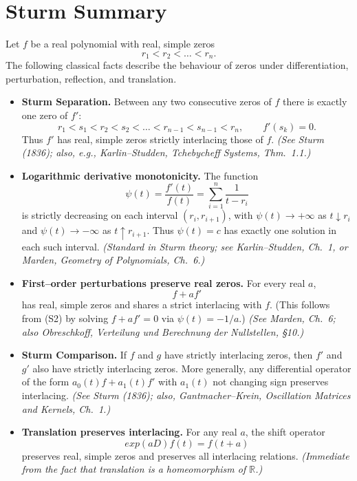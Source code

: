 \documentclass[11pt]{article}
\theoremstyle{breakdef}
\begin{document}
\section{Sturm Summary}

Let $f$ be a real polynomial with real, simple zeros
\[
r_1 < r_2 < \dots < r_n.
\]
The following classical facts describe the behaviour of zeros under
differentiation, perturbation, reflection, and translation.

\begin{itemize}

\item[\textbf{(S1)}] 
\textbf{Sturm Separation.}
Between any two consecutive zeros of $f$ there is exactly one zero of $f'$:
\[
r_1 < s_1 < r_2 < s_2 < \dots < r_{n-1} < s_{n-1} < r_n,
\qquad f'(s_k)=0.
\]
Thus $f'$ has real, simple zeros strictly interlacing those of $f$.
\textit{(See Sturm (1836); also, e.g., Karlin--Studden,
\emph{Tchebycheff Systems}, Thm.~1.1.)}

\item[\textbf{(S2)}]
\textbf{Logarithmic derivative monotonicity.}\newline
The function
\[
\psi(t)=\frac{f'(t)}{f(t)}=\sum_{i=1}^n \frac{1}{t-r_i}
\]
is strictly decreasing on each interval $(r_i,r_{i+1})$, with 
$\psi(t)\to +\infty$ as $t\downarrow r_i$ and 
$\psi(t)\to -\infty$ as $t\uparrow r_{i+1}$.
Thus $\psi(t)=c$ has exactly one solution in each such interval.
\textit{(Standard in Sturm theory; see Karlin--Studden, Ch.~1, or
Marden, \emph{Geometry of Polynomials}, Ch.~6.)}

\item[\textbf{(S3)}]
\textbf{First–order perturbations preserve real zeros.} \newline
For every real $a$,
\[
f + a f'
\]
has real, simple zeros and shares a strict interlacing with $f$.  
(This follows from (S2) by solving $f+af'=0$ via $\psi(t)=-1/a$.)
\textit{(See Marden, Ch.~6; also Obreschkoff,
\emph{Verteilung und Berechnung der Nullstellen}, §10.)}

\item[\textbf{(S4)}]
\textbf{Sturm Comparison.}
If $f$ and $g$ have strictly interlacing zeros, then $f'$ and $g'$
also have strictly interlacing zeros.
More generally, any differential operator of the form
$a_0(t)f + a_1(t)f'$ with $a_1(t)$ not changing sign
preserves interlacing.
\textit{(See Sturm (1836); also, Gantmacher–Krein,
\emph{Oscillation Matrices and Kernels}, Ch.~1.)}


\item[\textbf{(S5)}]
\textbf{Translation preserves interlacing.}
For any real $a$, the shift operator
\[
exp(aD)f(t) = f(t+a)
\]
preserves real, simple zeros and preserves all interlacing relations.
\textit{(Immediate from the fact that translation is a homeomorphism of $\mathbb{R}$.)}

\end{itemize}
\end{document}
